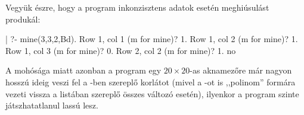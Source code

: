 Vegyük észre, hogy a program inkonzisztens adatok esetén meghiúsulást produkál:

\begin{prologcode}
| ?- mine(3,3,2,Bd).
Row 1, col 1 (m for mine)? 1.
Row 1, col 2 (m for mine)? 1.
Row 1, col 3 (m for mine)? 0.
Row 2, col 2 (m for mine)? 1.
no
\end{prologcode}

A \clpb mohósága miatt azonban a program egy $20 \times 20$-as aknamezőre már
nagyon hosszú ideig veszi fel a -ben szereplő 
korlátot (mivel a -ot is ,,polinom'' formára vezeti vissza a listában
szereplő összes változó esetén), ilyenkor a program szinte játszhatatlanul lassú lesz.